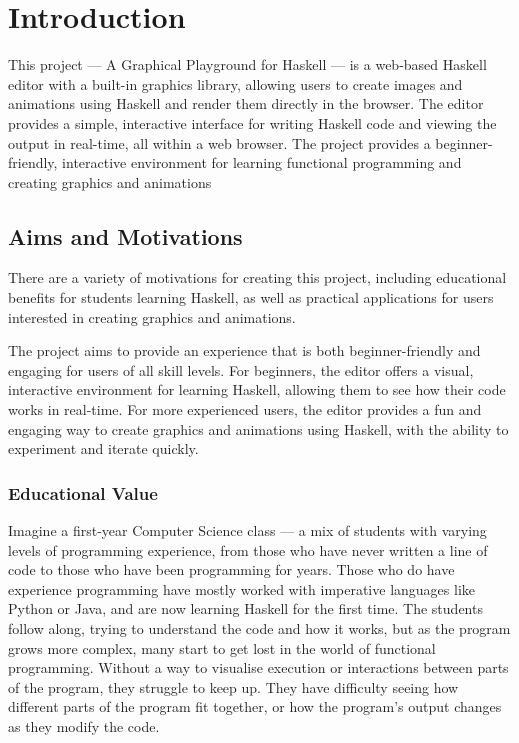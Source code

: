 \documentclass[../main.tex]{subfiles}
\begin{document}
\chapter{Introduction} \label{ch:introduction}
    This project — A Graphical Playground for Haskell — is a web-based Haskell
        editor with a built-in graphics library, allowing users to create images and
        animations using Haskell and render them directly in the browser.
    The editor provides a simple, interactive interface for writing Haskell code
        and viewing the output in real-time, all within a web browser.
    The project provides a beginner-friendly, interactive environment for learning
        functional programming and creating graphics and animations

        \section{Aims and Motivations} There are a variety of motivations for creating
            this project, including educational benefits for students learning Haskell, as
            well as practical applications for users interested in creating graphics and
            animations.

    The project aims to provide an experience that is both beginner-friendly and
        engaging for users of all skill levels.
    For beginners, the editor offers a visual, interactive environment for learning
        Haskell, allowing them to see how their code works in real-time.
    For more experienced users, the editor provides a fun and engaging way to
        create graphics and animations using Haskell, with the ability to experiment
        and iterate quickly.

    \subsection{Educational Value}
        Imagine a first-year Computer Science class — a mix of students with varying
            levels of programming experience, from those who have never written a line of
            code to those who have been programming for years.
        Those who do have experience programming have mostly worked with imperative
            languages like Python or Java, and are now learning Haskell for the first time.
        The students follow along, trying to understand the code and how it works, but
            as the program grows more complex, many start to get lost in the world of
            functional programming.
        Without a way to visualise execution or interactions between parts of the
            program, they struggle to keep up.
        They have difficulty seeing how different parts of the program fit together, or
            how the program's output changes as they modify the code.
\end{document}
